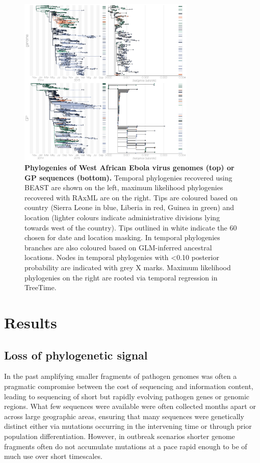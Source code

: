 \documentclass[11pt,oneside,letterpaper]{article}
\begin{document}
\begin{figure}[h]
 \centering
	\includegraphics[width=0.75\textwidth]{figures/fig1_trees.png}
	\caption{\textbf{Phylogenies of West African Ebola virus genomes (top) or GP sequences (bottom).}
	Temporal phylogenies recovered using BEAST are shown on the left, maximum likelihood phylogenies recovered with RAxML are on the right.
  Tips are coloured based on country (Sierra Leone in blue, Liberia in red, Guinea in green) and location (lighter colours indicate administrative divisions lying towards west of the country).
  Tips outlined in white indicate the 60 chosen for date and location masking.
  In temporal phylogenies branches are also coloured based on GLM-inferred ancestral locations.
  Nodes in temporal phylogenies with <0.10 posterior probability are indicated with grey X marks.
  Maximum likelihood phylogenies on the right are rooted via temporal regression in TreeTime.
	}
	\label{trees}
\end{figure}

\section*{Results}

\subsection*{Loss of phylogenetic signal}
In the past amplifying smaller fragments of pathogen genomes was often a pragmatic compromise between the cost of sequencing and information content, leading to sequencing of short but rapidly evolving pathogen genes or genomic regions.
What few sequences were available were often collected months apart or across large geographic areas, ensuring that many sequences were genetically distinct either via mutations occurring in the intervening time or through prior population differentiation.
However, in outbreak scenarios shorter genome fragments often do not accumulate mutations at a pace rapid enough to be of much use over short timescales.
\end{document}
